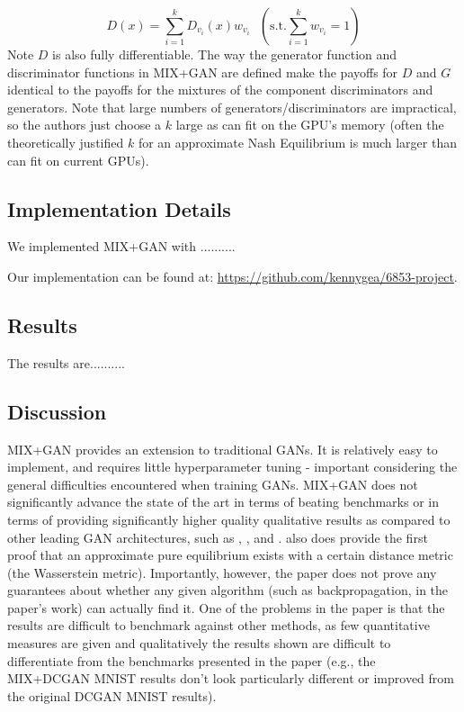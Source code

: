 \documentclass{article}
\begin{document}
\[
  D(x) = \sum\limits_{i = 1}^k D_{v_i}(x) w_{v_i} \mbox{  } (\mbox{s.t.} \sum\limits_{i=1}^k w_{v_i} = 1)
\]
Note $D$ is also fully differentiable. The way the generator function and discriminator functions in MIX+GAN are defined make the payoffs for $D$ and $G$ identical to the payoffs for the mixtures of the component discriminators and generators. Note that large numbers of generators/discriminators are impractical, so the authors just choose a $k$ large as can fit on the GPU's memory (often the theoretically justified $k$ for an approximate Nash Equilibrium is much larger than can fit on current GPUs).

\subsection{Implementation Details}
We implemented MIX+GAN with ..........

Our implementation can be found at: \url{https://github.com/kennygea/6853-project}.

\subsection{Results}
The results are..........

\subsection{Discussion}
MIX+GAN provides an extension to traditional GANs. It is relatively easy to implement, and requires little hyperparameter tuning - important considering the general difficulties encountered when training GANs. MIX+GAN does not significantly advance the state of the art in terms of beating benchmarks or in terms of providing significantly higher quality qualitative results as compared to other leading GAN architectures, such as \citet{DBLP:journals/corr/HuangLPHB16}, \citet{Salimans2016}, and \citet{DBLP:journals/corr/OdenaOS16}. \citet{Arora17} also does provide the first proof that an approximate pure equilibrium exists with a certain distance metric (the Wasserstein metric). Importantly, however, the paper does not prove any guarantees about whether any given algorithm (such as backpropagation, in the paper's work) can actually find it. One of the problems in the paper is that the results are difficult to benchmark against other methods, as few quantitative measures are given and qualitatively the results shown are difficult to differentiate from the benchmarks presented in the paper (e.g., the MIX+DCGAN MNIST results don't look particularly different or improved from the original DCGAN MNIST results).
\end{document}
